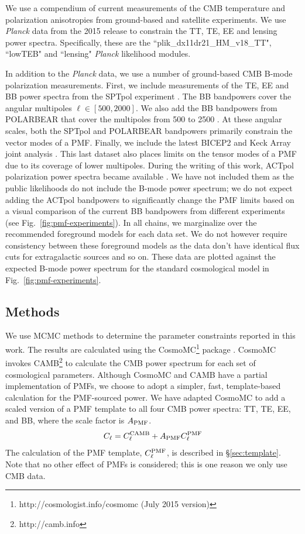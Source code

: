 \documentclass[apj]{emulateapj}
\newcommand{\cpmf}{\ensuremath{C_{\ell}^{\rm PMF}}}
\newcommand{\apmf}{\ensuremath{A_{\rm PMF}}}
\newcommand{\be}{\begin{equation}}
\newcommand{\ee}{\end{equation}}
\newcommand{\planck}{{\sl Planck}}
\newcommand{\pb}{POLARBEAR}
\newcommand{\sptpol}{SPTpol}
\begin{document}
We use a compendium of current measurements of the CMB temperature and polarization anisotropies from ground-based and satellite experiments. 
We use \planck{} data from the 2015 release to constrain the TT, TE, EE and lensing power spectra. 
Specifically, these are the ``plik\_dx11dr21\_HM\_v18\_TT", ``lowTEB" and ``lensing" \planck{} likelihood modules.


In addition to the \planck{} data, we use a number of ground-based CMB B-mode polarization measurements. 
First, we include measurements of the TE, EE and BB power spectra from the \sptpol{} experiment \citep{crites15,keisler15}. 
The BB bandpowers cover the angular multipoles $\ell \in [500,2000]$. 
We also add the BB bandpowers from \pb{} that cover the multipoles from 500 to 2500 \citep{polarbear15}. 
At these angular scales, both the \sptpol{} and \pb{} bandpowers primarily constrain the vector modes of a PMF. 
Finally, we include the latest BICEP2 and Keck Array  joint analysis \citep{bicepkeck15}. 
This last dataset also places limits on the tensor modes of a PMF due to its coverage of lower multipoles. 
During the writing of this work, ACTpol polarization power spectra became available \citep{naess14,louis16}. 
We have not included them as the public likelihoods do not include the B-mode power spectrum; we do not expect adding the ACTpol bandpowers to significantly change the PMF limits based on a visual comparison of the current BB bandpowers from different experiments (see Fig.~\ref{fig:pmf-experiments}).
In all chains, we marginalize over the recommended foreground models for each data set. 
We do not however require consistency between these foreground models as the data don't have identical flux cuts for extragalactic sources and so on. 
These data are plotted against the expected B-mode power spectrum for the standard cosmological model in Fig.~\ref{fig:pmf-experiments}. 

\subsection{Methods}

We use MCMC methods to determine the parameter constraints reported in this work. 
The results are calculated using  the {\textsc CosmoMC}\footnote{http://cosmologist.info/cosmomc (July 2015 version)} package \citep{lewis02b}. 
CosmoMC invokes  CAMB\footnote{http://camb.info}  \citep{lewis00} to calculate the CMB power spectrum for each set of cosmological parameters. 
Although CosmoMC and CAMB have a partial implementation of PMFs, we choose to adopt a simpler, fast, template-based calculation for the PMF-sourced power. 
We have adapted CosmoMC to add a scaled version of a PMF template to all four CMB power spectra: TT, TE, EE, and BB, where the scale factor is \apmf. 
\be
C_\ell = C_\ell^{\rm{CAMB}} + \apmf \cpmf
\ee
The calculation of the PMF template, \cpmf, is described in \S\ref{sec:template}. 
Note that no other effect of  PMFs is considered; this is one reason we only use CMB data.
\end{document}
